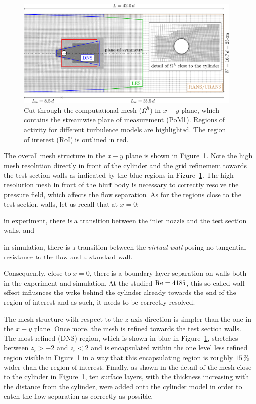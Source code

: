 \begin{figure}[htbp]
    \includegraphics[width=0.98\textwidth]{02_images/00_export/figure2.png}
    \caption{Cut through the computational mesh ($\Omega^{h}$) in $x-y$ plane, which contains the streamwise plane of measurement (PoM1). Regions of activity for different turbulence models are highlighted. The region of interest (RoI) is outlined in red.}
    \label{fig:compMesh}
\end{figure}

The overall mesh structure in the $x-y$ plane is shown in Figure~\ref{fig:compMesh}. Note the high mesh resolution directly in front of the cylinder and the grid refinement towards the test section walls as indicated by the blue regions in Figure~\ref{fig:compMesh}. The high-resolution mesh in front of the bluff body is necessary to correctly resolve the pressure field, which affects the flow separation. As for the regions close to the test section walls, let us recall that at $x = 0$;
\begin{inparaenum}[(i)]
 \item in experiment, there is a transition between the inlet nozzle and the test section walls, and
 \item in simulation, there is a transition between the \textit{virtual wall} posing no tangential resistance to the flow and a standard wall.
\end{inparaenum}
Consequently, close to $x = 0$, there is a boundary layer separation on walls both in the experiment and simulation. At the studied $\mathrm{Re} = 4185$, this so-called wall effect influences the wake behind the cylinder already towards the end of the region of interest and as such, it needs to be correctly resolved.

The mesh structure with respect to the $z$ axis direction is simpler than the one in the $x-y$ plane. Once more, the mesh is refined towards the test section walls. The most refined (DNS) region, which is shown in blue in Figure~\ref{fig:compMesh}, stretches between $z_{r} > -2$ and $z_{r} < 2$ and is encapsulated within the one level less refined region visible in Figure~\ref{fig:compMesh} in a way that this encapsulating region is roughly {$15\,\%$} wider than the region of interest. Finally, as shown in the detail of the mesh close to the cylinder in Figure~\ref{fig:compMesh}, ten surface layers, with the thickness increasing with the distance from the cylinder, were added onto the cylinder model in order to catch the flow separation as correctly as possible.


